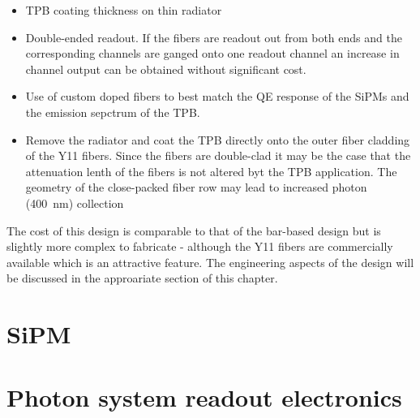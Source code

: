\begin{itemize}

\item{TPB coating thickness on thin radiator}

\item{Double-ended readout. If the fibers are readout out from both
  ends and the corresponding channels are ganged onto one readout
  channel an increase in channel output can be obtained without
  significant cost.}

\item{Use of custom doped fibers to best match the QE response of the
  SiPMs and the emission sepctrum of the TPB.}

\item{Remove the radiator and coat the TPB directly onto the outer
  fiber cladding of the Y11 fibers. Since the fibers are double-clad
  it may be the case that the attenuation lenth of the fibers is not
  altered byt the TPB application. The geometry of the close-packed
  fiber row may lead to increased photon (400~nm) collection}

\end{itemize}

The cost of this design is comparable to that of the bar-based design
but is slightly more complex to fabricate - although the Y11 fibers
are commercially available which is an attractive feature. The
engineering aspects of the design will be discussed in the approariate
section of this chapter. 

\section{SiPM}

\section{Photon system readout electronics}
\label{sec_elec}

